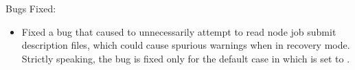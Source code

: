 \noindent Bugs Fixed:

\begin{itemize}

\item Fixed a bug that caused  to unnecessarily attempt
to read node job submit description files, 
which could cause spurious warnings when in recovery mode.
Strictly speaking, the bug is fixed only for the
default case in which  is set
to .

\end{itemize}

